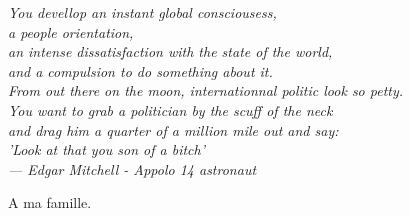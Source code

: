 \thispagestyle{empty}
{}

\vspace*{3cm}
%


\begin{flushright}{\slshape    
	You devellop an instant global consciousess, \\
	a people orientation,\\
	an intense dissatisfaction with the state of the world,\\
	and a compulsion to do something about it.\\
	From out there on the moon, internationnal politic look so petty. \\
	You want to grab a politician by the scuff of the neck\\
	and drag him a quarter of a million mile out and say: \\
	'Look at that you son of a bitch'\\ \medskip 
	--- Edgar Mitchell - Appolo 14 astronaut }
\end{flushright}

\vspace*{6cm}

\begin{flushright}
A ma famille.
\end{flushright}
